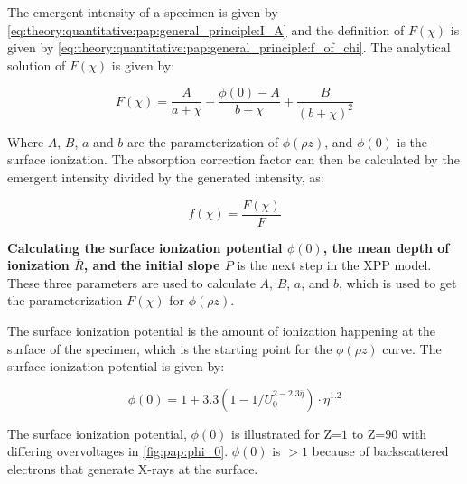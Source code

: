 The emergent intensity of a specimen is given by \cref{eq:theory:quantitative:pap:general_principle:I_A} and the definition of $F(\chi)$ is given by \cref{eq:theory:quantitative:pap:general_principle:f_of_chi}. The analytical solution of $F(\chi)$ is given by:



\begin{equation}
    \label{eq:theory:quantitative:pap:F_of_chi}
    F(\chi) = \frac{A}{a+ \chi} + \frac{\phi(0) - A}{b + \chi} + \frac{B}{(b + \chi)^2}
\end{equation}

Where $A$, $B$, $a$ and $b$ are the parameterization of $\phi(\rho z)$, and $\phi(0)$ is the surface ionization.
The absorption correction factor can then be calculated by the emergent intensity divided by the generated intensity, as:

\begin{equation}
    \label{eq:theory:quantitative:pap:absorption_correction}
    f(\chi) = \frac{F(\chi)}{F}
\end{equation}




\textbf{Calculating the surface ionization potential $\phi(0)$, the mean depth of ionization $\bar{R}$, and the initial slope $P$} is the next step in the XPP model.
These three parameters are used to calculate $A$, $B$, $a$, and $b$, which is used to get the parameterization $F(\chi)$ for $\phi(\rho z)$.


The surface ionization potential is the amount of ionization happening at the surface of the specimen, which is the starting point for the $\phi(\rho z)$ curve. The surface ionization potential is given by:

\begin{equation}
    \label{eq:theory:quantitative:pap:phi_0}
    \phi(0) = 1 + 3.3 (1-1/U_0^{2 - 2.3 \bar{\eta}}) \cdot \bar{\eta}^{1.2}
\end{equation}


The surface ionization potential, $\phi(0)$ is illustrated for Z=$1$ to Z=$90$ with differing overvoltages in \cref{fig:pap:phi_0}. 
$\phi(0)$ is $>1$ because of backscattered electrons that generate X-rays at the surface.



